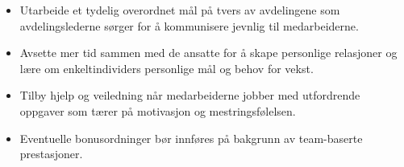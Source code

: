 \begin{itemize}
\item Utarbeide et tydelig overordnet mål på tvers av avdelingene som avdelingslederne sørger for å kommunisere jevnlig til medarbeiderne.
\item Avsette mer tid sammen med de ansatte for å skape personlige relasjoner og lære om enkeltindividers personlige mål og behov for vekst.
\item Tilby hjelp og veiledning når medarbeiderne jobber med utfordrende oppgaver som tærer på motivasjon og mestringsfølelsen.
\item Eventuelle bonusordninger bør innføres på bakgrunn av team-baserte prestasjoner.
\end{itemize}

